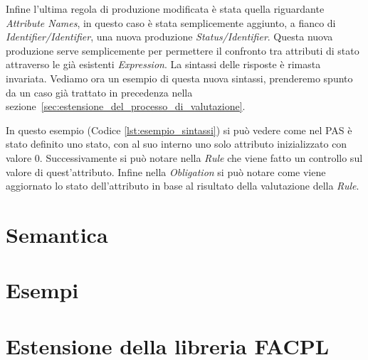Infine l'ultima regola di produzione modificata è stata quella riguardante \textit{Attribute Names}, in questo caso è stata semplicemente aggiunto, a fianco di \textit{Identifier/Identifier}, una nuova produzione \textit{Status/Identifier}. Questa nuova produzione serve semplicemente per permettere il confronto tra attributi di stato attraverso le già esistenti \textit{Expression}.
La sintassi delle risposte è rimasta invariata.
Vediamo ora un esempio di questa nuova sintassi, prenderemo spunto da un caso già trattato in precedenza nella sezione~\ref{sec:estensione_del_processo_di_valutazione}.

In questo esempio (Codice \ref{lst:esempio_sintassi}) si può vedere come nel PAS è stato definito uno stato, con al suo interno uno solo attributo inizializzato con valore 0.
Successivamente si può notare nella \textit{Rule} che viene fatto un controllo sul valore di quest'attributo.
Infine nella \textit{Obligation} si può notare come viene aggiornato lo stato dell'attributo in base al risultato della valutazione della \textit{Rule}.

\section{Semantica} %
\label{sec:semantica}



\section{Esempi} %
\label{sec:esempi}



\section{Estensione della libreria FACPL} %
\label{sec:estensione_della_libreria_facpl}

